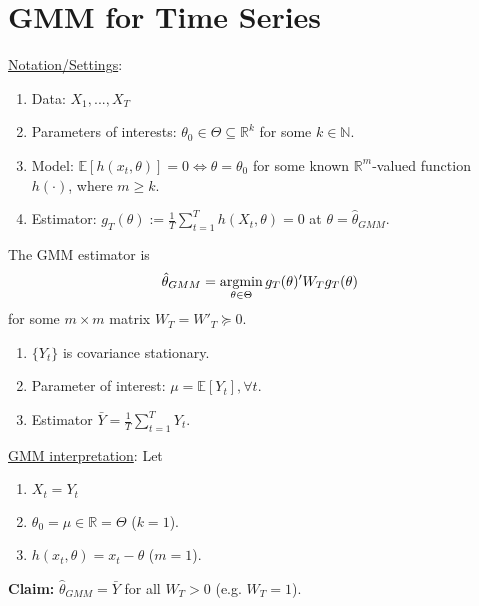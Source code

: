 \documentclass[11pt]{elegantbook}
\newcommand{\argmin}{\operatornamewithlimits{argmin}}
\begin{document}
\section{GMM for Time Series}
\underline{Notation/Settings}:
\begin{enumerate}
    \item Data: $X_{1},...,X_T$
    \item Parameters of interests: $\theta_0\in \Theta\subseteq \mathbb{R}^k$ for some $k\in \mathbb{N}$.
    \item Model: $\mathbb{E}[h(x_t,\theta)]=0\Leftrightarrow \theta=\theta_0$ for some known $\mathbb{R}^m$-valued function $h(\cdot)$, where $m\geq k$.
    \item Estimator: $g_T(\theta):=\frac{1}{T}\sum_{t=1}^T h(X_t,\theta)=0$ at $\theta=\hat{\theta}_{GMM}$.
\end{enumerate}
\begin{definition}
    The GMM estimator is
    $$\hat{\theta}_{GMM}=\argmin_{\theta\in \Theta}g_T(\theta)'W_Tg_T(\theta)$$ for some $m\times m$ matrix $W_T=W'_T\succeq 0$.
\end{definition}

\begin{example}
    \begin{enumerate}
        \item $\{Y_t\}$ is covariance stationary.
        \item Parameter of interest: $\mu=\mathbb{E}[Y_t],\forall t$.
        \item Estimator $\bar{Y}=\frac{1}{T}\sum_{t=1}^T Y_t$.
    \end{enumerate}
    \underline{GMM interpretation}: Let
    \begin{enumerate}
        \item $X_t=Y_t$
        \item $\theta_0=\mu\in \mathbb{R}=\Theta$ ($k=1$).
        \item $h(x_t,\theta)=x_t-\theta$ ($m=1$).
    \end{enumerate}
    \textbf{Claim:} $\hat{\theta}_{GMM}=\bar{Y}$ for all $W_T>0$ (e.g. $W_T=1$).
\end{example}
\end{document}
